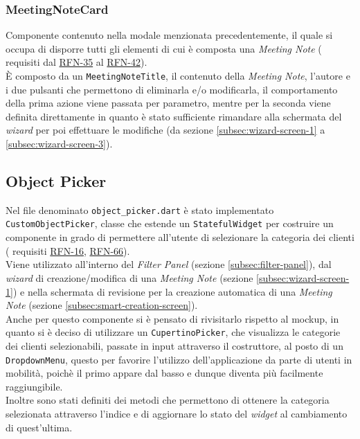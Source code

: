 \subsubsection*{MeetingNoteCard}
\label{subsubsec:meeting-note-card}

Componente contenuto nella modale menzionata precedentemente, il quale si occupa di disporre tutti gli elementi di cui è composta una \emph{Meeting Note} ( requisiti dal \hyperref[RFN-35]{RFN-35} al \hyperref[RFN-42]{RFN-42}).\\
È composto da un \lstinline{MeetingNoteTitle}, il contenuto della \emph{Meeting Note}, l'autore e i due pulsanti che permettono di eliminarla e/o modificarla, il comportamento della prima azione viene passata per parametro, mentre per la seconda viene definita direttamente in quanto è stato sufficiente rimandare alla schermata del \emph{wizard} per poi effettuare le modifiche (da sezione \ref{subsec:wizard-screen-1} a \ref{subsec:wizard-screen-3}).

\subsection{Object Picker}
\label{subsec:object-picker}

Nel file denominato \lstinline{object_picker.dart} è stato implementato \lstinline{CustomObjectPicker}, classe che estende un \lstinline{StatefulWidget} per costruire un componente in grado di permettere all'utente di selezionare la categoria dei clienti ( requisiti \hyperref[RFN-16]{RFN-16}, \hyperref[RFN-66]{RFN-66}). \\
Viene utilizzato all'interno del \emph{Filter Panel} (sezione \ref{subsec:filter-panel}), dal \emph{wizard} di creazione/modifica di una \emph{Meeting Note} (sezione \ref{subsec:wizard-screen-1}) e nella schermata di revisione per la creazione automatica di una \emph{Meeting Note} (sezione \ref{subsec:smart-creation-screen}).\\
Anche per questo componente si è pensato di rivisitarlo rispetto al \gls{mockup}\glsoccur, in quanto si è deciso di utilizzare un \lstinline{CupertinoPicker}\cite{site:cupertino-picker}, che visualizza le categorie dei clienti selezionabili, passate in input attraverso il costruttore, al posto di un \lstinline{DropdownMenu}\cite{site:dropdown-menu}, questo per favorire l'utilizzo dell'applicazione da parte di utenti in mobilità, poichè il primo appare dal basso e dunque diventa più facilmente raggiungibile. \\
Inoltre sono stati definiti dei metodi che permettono di ottenere la categoria selezionata attraverso l'indice e di aggiornare lo stato del \emph{widget} al cambiamento di quest'ultima.



